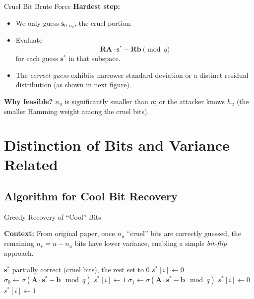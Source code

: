 \documentclass{beamer}
\begin{document}
\begin{frame}{Cruel Bit Brute Force}
  \textbf{Hardest step:}
  \begin{itemize}
    \item We only guess $\mathbf{s}_{0:n_u}$, the cruel portion.
    \item Evaluate
      \[
        \mathbf{R}\mathbf{A} \cdot \mathbf{s}^* - \mathbf{R}\mathbf{b} \pmod{q}
      \]
      for each guess $\mathbf{s}^*$ in that subspace.
    \item The \emph{correct guess} exhibits narrower standard deviation or a distinct residual distribution (as shown in next figure).
  \end{itemize}

  \vspace{0.4cm}
  \textbf{Why feasible?}  
  $n_u$ is significantly smaller than $n$; or the attacker knows $h_u$ (the smaller Hamming weight among the cruel bits).
\end{frame} 
\section{Distinction of Bits and Variance Related}
\subsection*{Algorithm for Cool Bit Recovery}
\begin{frame}{Greedy Recovery of ``Cool'' Bits}
  
  \textbf{Context:} From original paper, once $n_u$ ``cruel'' bits are correctly guessed, the remaining $n_r = n - n_u$ bits have lower variance, enabling a simple \emph{bit-flip} approach.
  
  \begin{algorithm}[H]
  \caption{\small Greedy Recovery of Cool Bits}
  \label{alg:greedy-cool}
  \footnotesize
  \begin{algorithmic}[1]
  \Require $\mathbf{s}^*$ partially correct (cruel bits), the rest set to 0
    \State $s^*[i] \gets 0$
    \State $\sigma_0 \gets \sigma(\mathbf{A}\cdot \mathbf{s}^* - \mathbf{b}\mod q)$
    \State $s^*[i] \gets 1$
    \State $\sigma_1 \gets \sigma(\mathbf{A}\cdot \mathbf{s}^* - \mathbf{b}\mod q)$
      \State $s^*[i] \gets 0$
    \Else
      \State $s^*[i] \gets 1$
    \EndIf
  \EndFor
  \end{algorithmic}
  \end{algorithm}
  
  \end{frame}
  
\end{document}
